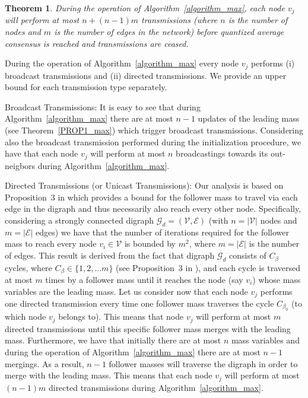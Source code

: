 \documentclass[twocolumn]{autart}    %
\newtheorem{theorem}{Theorem}
\begin{document}

\begin{theorem}\label{bound_trans}
During the operation of Algorithm~\ref{algorithm_max}, each node $v_j$ will perform at most $n + (n-1)m$ transmissions (where $n$ is the number of nodes and $m$ is the number of edges in the network) before quantized average consensus is reached and transmissions are ceased. 
\end{theorem}

\begin{pf}
During the operation of Algorithm~\ref{algorithm_max} every node $v_j$ performs (i) broadcast transmissions and (ii) directed transmissions. 
We provide an upper bound for each transmission type separately. 

\noindent
Broadcast Transmissions: 
It is easy to see that during Algorithm~\ref{algorithm_max} there are at most $n-1$ updates of the leading mass (see Theorem~\ref{PROP1_max}) which trigger broadcast transmissions. 
Considering also the broadcast transmission performed during the initialization procedure, we have that each node $v_j$ will perform at most $n$ broadcastings towards its out-neigbors during Algorithm~\ref{algorithm_max}. 

\noindent
Directed Transmissions (or Unicast Transmissions):
Our analysis is based on Proposition~$3$ in \cite{2014:RikosHadj} which provides a bound for the follower mass to travel via each edge in the digraph and thus necessarily also reach every other node. 
Specifically, considering a strongly connected digraph $\mathcal{G}_d = (\mathcal{V}, \mathcal{E})$ (with $n=|\mathcal{V}|$ nodes and $m=|\mathcal{E}|$ edges) we have that the number of iterations required for the follower mass to reach every node $v_i \in \mathcal{V}$ is bounded by $m^2$, where $m = | \mathcal{E} |$ is the number of edges. 
This result is derived from the fact that digraph $\mathcal{G}_d$ consists of $C_\beta$ cycles, where $C_\beta \in \{ 1, 2, ... m \}$ (see Proposition~$3$ in \cite{2014:RikosHadj}), and each cycle is traversed at most $m$ times by a follower mass until it reaches the node (say $v_i$) whose mass variables are the leading mass. 
Let us consider now that each node $v_j$ performs one directed transmission every time one follower mass traverses the cycle $C_{\beta_0}$ (to which node $v_j$ belongs to). 
This means that node $v_j$ will perform at most $m$ directed transmissions until this specific follower mass merges with the leading mass. 
Furthermore, we have that initially there are at most $n$ mass variables and during the operation of Algorithm~\ref{algorithm_max} there are at most $n-1$ mergings. 
As a result, $n-1$ follower masses will traverse the digraph in order to merge with the leading mass. 
This means that each node $v_j$ will perform at most $(n-1)m$ directed transmissions during Algorithm~\ref{algorithm_max}. 


\end{pf}
\end{document}

